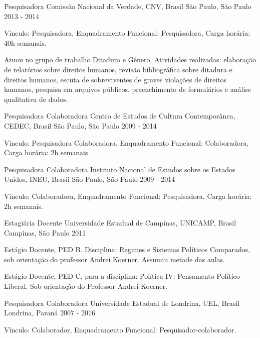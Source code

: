 
\begin{cventries}

\cventry
{Pesquisadora}
{Comissão Nacional da Verdade, CNV, Brasil}
{São Paulo, São Paulo}
{2013 - 2014}
{
\begin{cvitems}
  \item Vínculo: Pesquisadora, Enquadramento Funcional: Pesquisadora, Carga horária: 40h semanais.
  \item Atuou no grupo de trabalho Ditadura e Gênero. Atividades realizadas: elaboração de relatórios sobre direitos humanos, revisão bibliográfica sobre ditadura e direitos humanos, escuta de sobreviventes de graves violações de direitos humanos, pesquisa em arquivos públicos, preenchimento de formulários e análise qualitativa de dados.
\end{cvitems}
}

\cventry
{Pesquisadora Colaboradora}
{Centro de Estudos de Cultura Contemporânea, CEDEC, Brasil}
{São Paulo, São Paulo}
{2009 - 2014}
{
\begin{cvitems}
  \item Vínculo: Pesquisadora Colaboradora, Enquadramento Funcional: Colaboradora, Carga horária: 2h semanais.
\end{cvitems}
}

\cventry
{Pesquisadora Colaboradora}
{Instituto Nacional de Estudos sobre os Estados Unidos, INEU, Brasil}
{São Paulo, São Paulo}
{2009 - 2014}
{
\begin{cvitems}
  \item Vínculo: Colaboradora, Enquadramento Funcional: Pesquisadora, Carga horária: 2h semanais.
\end{cvitems}
}

\cventry
{Estagiária Docente}
{Universidade Estadual de Campinas, UNICAMP, Brasil}
{Campinas, São Paulo}
{2011}
{
\begin{cvitems}
  \item Estágio Docente, PED B. Disciplina: Regimes e Sistemas Políticos Comparados, sob orientação do professor Andrei Koerner. Assumiu metade das aulas.
  \item Estágio Docente, PED C, para a disciplina: Política IV: Pensamento Político Liberal. Sob orientação do Professor Andrei Koerner.
\end{cvitems}
}

\cventry
{Pesquisadora Colaboradora}
{Universidade Estadual de Londrina, UEL, Brasil}
{Londrina, Paraná}
{2007 - 2016}
{
\begin{cvitems}
  \item Vínculo: Colaborador, Enquadramento Funcional: Pesquisador-colaborador.
\end{cvitems}
}

\end{cventries}

